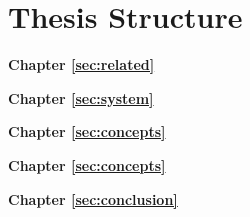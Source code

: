 \Blindtext[1][2]

\section{Thesis Structure}
\label{sec:intro:structure}

\textbf{Chapter \ref{sec:related}} \\[0.2em]
\blindtext

\textbf{Chapter \ref{sec:system}} \\[0.2em]
\blindtext

\textbf{Chapter \ref{sec:concepts}} \\[0.2em]
\blindtext

\textbf{Chapter \ref{sec:concepts}} \\[0.2em]
\blindtext

\textbf{Chapter \ref{sec:conclusion}} \\[0.2em]
\blindtext
